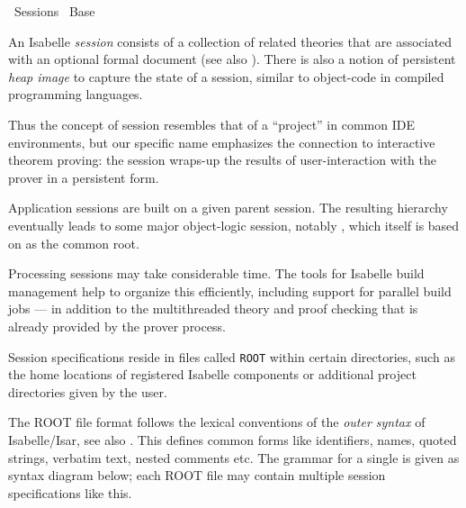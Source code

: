 %
\begin{isabellebody}%
\def\isabellecontext{Sessions}%
%
\isadelimtheory
%
\endisadelimtheory
%
\isatagtheory
{}\isamarkupfalse%
\ Sessions\isanewline
{}\ Base\isanewline
{}%
\endisatagtheory
{\isafoldtheory}%
%
\isadelimtheory
%
\endisadelimtheory
%
\isamarkuptrue%
%
\begin{isamarkuptext}%
An Isabelle \emph{session} consists of a collection of related
  theories that are associated with an optional formal document (see
  also ).  There is also a notion of persistent
  \emph{heap image} to capture the state of a session, similar to
  object-code in compiled programming languages.

  Thus the concept of session resembles that of a ``project'' in
  common IDE environments, but our specific name emphasizes the
  connection to interactive theorem proving: the session wraps-up the
  results of user-interaction with the prover in a persistent form.

  \medskip Application sessions are built on a given parent session.
  The resulting hierarchy eventually leads to some major object-logic
  session, notably , which itself is based on  as the common root.

  Processing sessions may take considerable time.  The tools for
  Isabelle build management help to organize this efficiently,
  including support for parallel build jobs --- in addition to the
  multithreaded theory and proof checking that is already provided by
  the prover process.%
\end{isamarkuptext}%
\isamarkuptrue%
%
\isamarkuptrue%
%
\begin{isamarkuptext}%
Session specifications reside in files called \verb|ROOT|
  within certain directories, such as the home locations of registered
  Isabelle components or additional project directories given by the
  user.

  The ROOT file format follows the lexical conventions of the
  \emph{outer syntax} of Isabelle/Isar, see also
  \cite{isabelle-isar-ref}.  This defines common forms like
  identifiers, names, quoted strings, verbatim text, nested comments
  etc.  The grammar for a single \hyperlink{syntax.session-entry}{\mbox{}} is given as
  syntax diagram below; each ROOT file may contain multiple session
  specifications like this.


\end{isamarkuptext}
\end{isabellebody}
